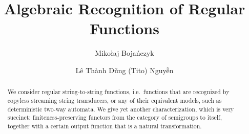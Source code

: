 \documentclass[a4paper,USenglish,cleveref,autoref,numberwithinsect]{lipics-v2021}
\title{Algebraic Recognition of Regular Functions} %
\author{Mikołaj Bojańczyk}{Institute of Informatics, University of Warsaw, Poland \and \url{https://www.mimuw.edu.pl/~bojan/}}{bojan@mimuw.edu.pl}{}{}%
\author{Lê Thành Dũng (Tito) Nguy\~{\^e}n}{Laboratoire de l'informatique du parallélisme (LIP), École normale supérieure de Lyon, France \and \url{https://nguyentito.eu/}}{nltd@nguyentito.eu}{https://orcid.org/0000-0002-6900-5577}{Supported by the LABEX MILYON (ANR-10-LABX-0070) of Université de Lyon, within the program \enquote{Investissements d'Avenir} (ANR-11-IDEX-0007) operated by the French National Research Agency (ANR).}
\begin{document}
\maketitle

\begin{abstract}
    We consider regular string-to-string functions, i.e.~functions that are recognized by copyless streaming string transducers, or  any of their equivalent models, such as deterministic two-way automata. We give yet another characterization, which is very succinct: finiteness-preserving functors from the category of semigroups to itself, together with a certain output function that is a natural transformation.
\end{abstract}

\newcommand{\moncat}{\mathrm{Mon}}
\newcommand{\semcat}{\mathrm{Sem}}












\appendix





\end{document}
